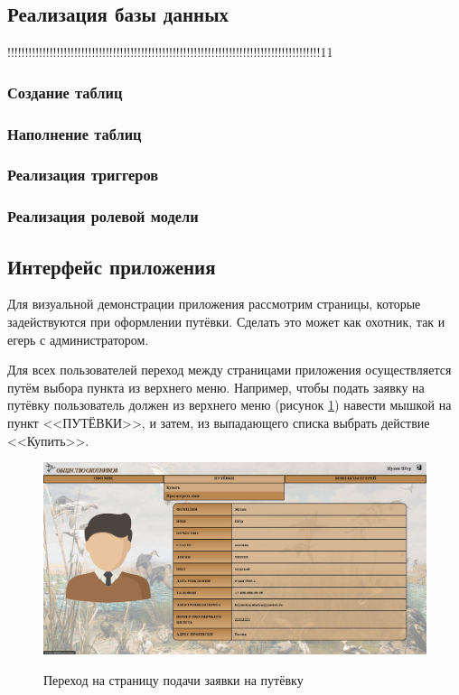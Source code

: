 	\subsection{Реализация базы данных}
	!!!!!!!!!!!!!!!!!!!!!!!!!!!!!!!!!!!!!!!!!!!!!!!!!!!!!!!!!!!!!!!!!!!!!!!!!!!!!!!!!!!!!!!!!11
	\subsubsection{Создание таблиц}
	\subsubsection{Наполнение таблиц}
	\subsubsection{Реализация триггеров}
	\subsubsection{Реализация ролевой модели}
	
	\subsection{Интерфейс приложения}
	Для визуальной демонстрации приложения рассмотрим страницы, которые задействуются при оформлении путёвки. Сделать это может как охотник, так и егерь с администратором. 
	
	
	Для всех пользователей переход между страницами приложения осуществляется путём выбора пункта из верхнего меню. Например, чтобы подать заявку на путёвку пользователь должен из верхнего меню (рисунок \ref{fig10:image}) навести мышкой на пункт <<ПУТЁВКИ>>, и затем, из выпадающего списка выбрать действие <<Купить>>.
	
	\begin{figure}[h]
		\centering
		\begin{center}
			{\includegraphics[scale=0.34]{schemes/screens/start.png}}
			\caption{Переход на страницу подачи заявки на путёвку}
			\label{fig10:image}
		\end{center}
	\end{figure}


